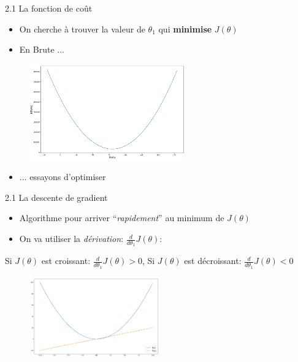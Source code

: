 \begin{frame}{2.1 La fonction de coût}
  \begin{itemize}
  \item On cherche à trouver la valeur de $\theta_{1}$ qui \textbf{minimise} $J(\theta)$
    \vspace{0.2cm}
  \item En Brute ...
  \end{itemize}
  \vspace{-0.5cm}
  \begin{figure}
    \includegraphics[width=0.6\textwidth]{figs/costFct.png}
  \end{figure}
  \vspace{-0.5cm}
  \begin{itemize}
  \item ... essayons d'optimiser
  \end{itemize}
\end{frame}

\begin{frame}{2.1 La descente de gradient}
  \begin{itemize}
  \item Algorithme pour arriver ``\textit{rapidement}'' au minimum de $J(\theta)$ 
    \vspace{0.2cm}
  \item On va utiliser la \textit{dérivation}: $\frac{d}{d\theta_{1}}J(\theta)$:
  \end{itemize}
  \begin{center}
    Si $J(\theta)$ est croissant: $\frac{d}{d\theta_{1}}J(\theta) > 0$, \hspace{0.5cm}
    Si $J(\theta)$ est décroissant: $\frac{d}{d\theta_{1}}J(\theta) < 0$
  \end{center}
  \vspace{-0.5cm}
  \begin{figure}
    \includegraphics[width=0.5\textwidth]{figs/derivation.png}
  \end{figure}
  \vspace{-0.5cm}
\end{frame}

